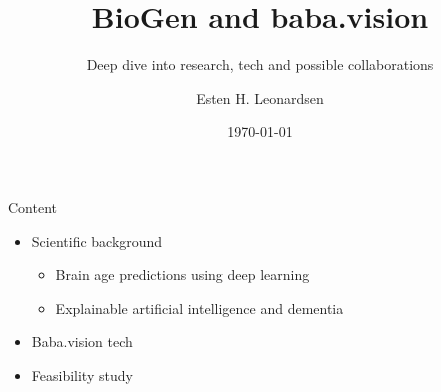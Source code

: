 \documentclass{beamer}
\title{BioGen and baba.vision}
\subtitle{Deep dive into research, tech and possible collaborations}
\date{\today}
\author{Esten H. Leonardsen}
\begin{document}
    \begin{frame}
        \titlepage
    \end{frame}

    \begin{frame}{Content}
        \begin{itemize}
            \item Scientific background
            \begin{itemize}
                \item Brain age predictions using deep learning
                \item Explainable artificial intelligence and dementia
            \end{itemize}
            \item Baba.vision tech
            \item Feasibility study
        \end{itemize}
    \end{frame}

    
    
\end{document}

